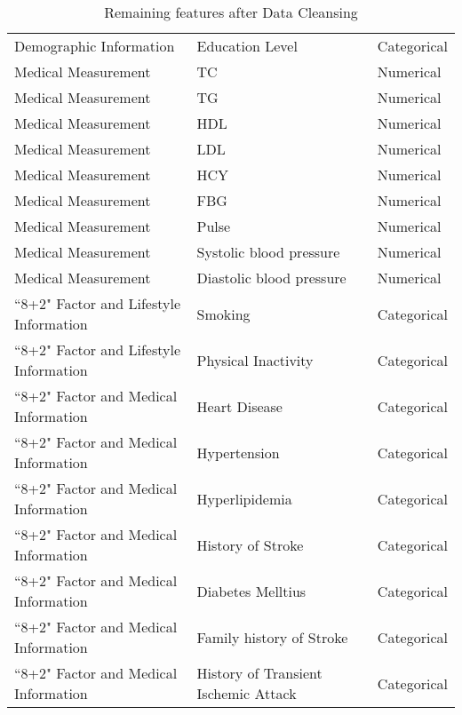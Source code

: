 \documentclass{article}
\begin{document}
\begin{table}[H]
\begin{tabular}{lll}
Demographic Information                 & Education Level          & Categorical        \\
Medical Measurement                     & TC                       & Numerical          \\
Medical Measurement                     & TG                       & Numerical          \\
Medical Measurement                     & HDL                      & Numerical          \\
Medical Measurement                     & LDL                      & Numerical          \\
Medical Measurement                     & HCY                      & Numerical          \\
Medical Measurement                     & FBG                      & Numerical          \\
Medical Measurement                     & Pulse                    & Numerical          \\
Medical Measurement                     & Systolic blood pressure  & Numerical          \\
Medical Measurement                     & Diastolic blood pressure & Numerical          \\
``8+2" Factor and Lifestyle Information  & Smoking                  & Categorical        \\
``8+2" Factor and Lifestyle Information  & Physical Inactivity      & Categorical        \\
``8+2" Factor and Medical Information    & Heart Disease            & Categorical        \\
``8+2" Factor and Medical Information    & Hypertension             & Categorical        \\
``8+2" Factor and Medical Information    & Hyperlipidemia           & Categorical        \\
``8+2" Factor and Medical Information    & History of Stroke        & Categorical        \\ 
``8+2" Factor and Medical Information    & Diabetes Melltius        & Categorical        \\
``8+2" Factor and Medical Information    & Family history of Stroke & Categorical        \\
``8+2" Factor and Medical Information    & History of Transient Ischemic Attack        & Categorical \\ \hline
\end{tabular}
\caption{Remaining features after Data Cleansing}
\label{table:features}
\end{table}
\end{document}
